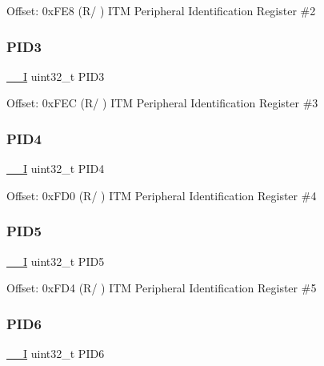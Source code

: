 Offset\+: 0x\+F\+E8 (R/ ) I\+TM Peripheral Identification Register \#2 \mbox{\label{struct_i_t_m___type_a510fcf8ad6966fdfb0767e624b74c64f}} 
\subsubsection{\texorpdfstring{PID3}{PID3}}
{\footnotesize\ttfamily \mbox{\hyperlink{core__sc300_8h_af63697ed9952cc71e1225efe205f6cd3}{\+\_\+\+\_\+I}} uint32\+\_\+t P\+I\+D3}

Offset\+: 0x\+F\+EC (R/ ) I\+TM Peripheral Identification Register \#3 \mbox{\label{struct_i_t_m___type_ad75960b83ea47a469e6a1406dd9eefa6}} 
\subsubsection{\texorpdfstring{PID4}{PID4}}
{\footnotesize\ttfamily \mbox{\hyperlink{core__sc300_8h_af63697ed9952cc71e1225efe205f6cd3}{\+\_\+\+\_\+I}} uint32\+\_\+t P\+I\+D4}

Offset\+: 0x\+F\+D0 (R/ ) I\+TM Peripheral Identification Register \#4 \mbox{\label{struct_i_t_m___type_a7276a30c464f0b34944b6eb16d3df077}} 
\subsubsection{\texorpdfstring{PID5}{PID5}}
{\footnotesize\ttfamily \mbox{\hyperlink{core__sc300_8h_af63697ed9952cc71e1225efe205f6cd3}{\+\_\+\+\_\+I}} uint32\+\_\+t P\+I\+D5}

Offset\+: 0x\+F\+D4 (R/ ) I\+TM Peripheral Identification Register \#5 \mbox{\label{struct_i_t_m___type_ae5d83564471b76d88088a949ca67ac9b}} 
\subsubsection{\texorpdfstring{PID6}{PID6}}
{\footnotesize\ttfamily \mbox{\hyperlink{core__sc300_8h_af63697ed9952cc71e1225efe205f6cd3}{\+\_\+\+\_\+I}} uint32\+\_\+t P\+I\+D6}

